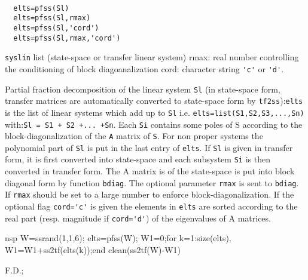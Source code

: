 \begin{mandesc}
   \\ %
\end{mandesc}
\begin{calling_sequence}
\begin{verbatim}
  elts=pfss(Sl)  
  elts=pfss(Sl,rmax)  
  elts=pfss(Sl,'cord')  
  elts=pfss(Sl,rmax,'cord')  
\end{verbatim}
\end{calling_sequence}
\begin{parameters}
  \begin{varlist}
     \verb!syslin! list (state-space or transfer linear system)
    rmax: real number controlling the conditioning of block
    diagoanalization cord: character string \verb!'c'!
    or \verb!'d'!.
  \end{varlist}
\end{parameters}
\begin{mandescription}
  Partial fraction decomposition of the linear system \verb!Sl! (in state-space 
  form, transfer matrices are automatically converted to state-space form
  by \verb!tf2ss!):\verb!elts! is the list of linear systems which add up to \verb!Sl!
  i.e. \verb!elts=list(S1,S2,S3,...,Sn)! with:\verb!Sl = S1 + S2 +... +Sn!.
  Each \verb!Si! contains some poles of \verb!!S according to the 
  block-diagonalization of the \verb!A! matrix of \verb!S!.
  For non proper systems the polynomial part of \verb!Sl! is put
  in the last entry of \verb!elts!.
  If \verb!Sl! is given in transfer form, it is first converted into state-space
  and each subsystem \verb!Si! is then converted in transfer form.
  The A matrix is of the state-space is put into block diagonal form
  by function \verb!bdiag!. The optional parameter \verb!rmax! is sent to
  \verb!bdiag!. If \verb!rmax! should be set to a large number to enforce
  block-diagonalization.
  If the optional flag \verb!cord='c'! is given the elements in \verb!elts!
  are sorted according to the real part (resp. magnitude if \verb!cord='d'!)
  of the eigenvalues of A matrices.
\end{mandescription}
\begin{examples}
  \begin{mintednsp}{nsp}
    W=ssrand(1,1,6);
    elts=pfss(W); 
    W1=0;for k=1:size(elts), W1=W1+ss2tf(elts(k));end
    clean(ss2tf(W)-W1)
  \end{mintednsp}
\end{examples}
\begin{manseealso}
       
\end{manseealso}
\begin{authors}
  F.D.;   
\end{authors}
